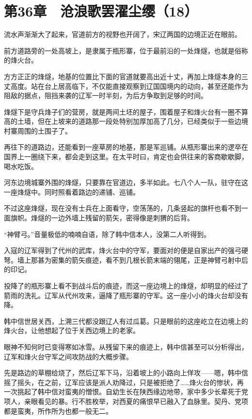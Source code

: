 \section{第36章　沧浪歌罢濯尘缨（18）}

流水声渐渐大了起来，官道前方的视野也开阔了，宋辽两国的边境正近在眼前。

前方道路旁的一处高坡上，是隶属于瓶形寨，位于最前沿的一处烽燧，也就是俗称的烽火台。

方方正正的烽燧，地基的位置比下面的官道就要高出近十丈，再加上烽燧本身的三丈高度。站在台上居高临下，不仅能直接观察到辽国国境内的动向，甚至还能作为阻敌的据点，阻挡来袭的辽军一时半刻，为后方争取到足够的时间。

烽燧下是守兵烽子们的营房，就是两间土坯的屋子，围着屋子和烽火台有一圈不算高的土墙，但在上坡来的道路那一段处特别加厚加高了几分，已经类似于一些边境村寨周围的土围子了。

再往下的道路边，还能看到一座草房的地基，那是军巡铺。从瓶形寨出来的逻卒在国界上一圈绕下来，都会走到这里。在太平时曰，肯定也会供往来的客商歇歇脚，喝水吃饭。

河东边境城寨外围的烽燧，只要靠在官道边，多半如此。七八个人一队，驻守在这一座烽燧中。同时照看着路边的递铺、巡铺。

不过这座烽燧，现在没有士兵在上面看守，空荡荡的，几条竖起的旗杆也看不到一面旗帜。烽燧的一边外墙上残留的箭矢，密得像是刺猬的后背。

“神臂弓。”音量极低的喃喃自语，除了韩中信本人，没第二人听得到。

入寇的辽军得到了代州的武库，烽火台中的守军，要面对的便是自家出产的强弓硬弩。墙上那甚为密集的箭矢痕迹，看不到几根长箭末端的翎尾，正是神臂弓射中后的印记。

投降了的瓶形寨上看不到战斗后的痕迹，而这一座边境上的烽燧，却明显的经过了箭雨的洗礼。辽军从代州攻来，逼降了瓶形寨的守军。这一座小小的烽火台却没有降。

韩中信世居关西，上溯三代都没跟辽人有过瓜葛。只是眼前的这座屹立在边境上的烽火台，让他想起了位于关西边境上的老家。

眼神不知何时已变得寒如冰雪。从残留下来的痕迹上，韩中信甚至可以分析得出，辽军和烽火台守军之间攻防战的大概步骤。

先是路边的草棚给烧了，然后辽军下马，沿着坡上的小路向上佯攻——嗯，韩中信摇了摇头，在之前，辽军应该是派人劝降过，只是被拒绝了……烽火台的惨状，再一次挑起了韩中信对蛮夷的憎恨。自幼生长在陕西缘边地带，家中多少长辈死于党项人，亲眼看见的暴。行不胜枚举，对西夏的痛恨早已融入了血脉里。契丹、党项都是蛮夷，所作所为也都一般无二。

